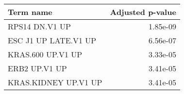 \begin{tabular}{lr}
\toprule
            Term name &  Adjusted p-value \\
\midrule
       RPS14 DN.V1 UP &          1.85e-09 \\
 ESC J1 UP LATE.V1 UP &          6.56e-07 \\
    KRAS.600 UP.V1 UP &          3.33e-05 \\
        ERB2 UP.V1 UP &          3.41e-05 \\
 KRAS.KIDNEY UP.V1 UP &          3.41e-05 \\
\bottomrule
\end{tabular}

